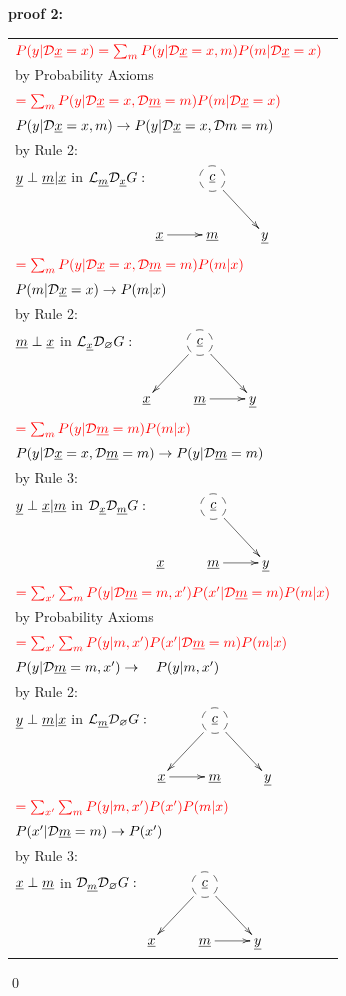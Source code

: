 {\bf * proof 2:}
\begin{longtable}{l}
$\color{red}
P(y|\cald\rvx=x)=
\sum_m
P(y|\cald\rvx=x, m)
P(m|\cald\rvx=x)$
\\
\quad by Probability Axioms
\\
$\color{red}=
\sum_m
P(y|\cald\rvx=x, \cald\rvm=m)
P(m|\cald\rvx=x)$
\\
\quad $P(y|\cald\rvx=x, m)\rarrow
P(y|\cald\rvx=x, \cald m=m)$
\\
\quad by Rule 2:
\\
\quad $\rvy\perp \rvm|\rvx$ in
$\call_\rvm\cald_\rvx G:$
$\xymatrix{
&*++[F-o]{\rvc}\ar[rd]
\\
\rvx\ar[r]
&\rvm
&\rvy
}$
\\
$\color{red}=
\sum_m
P(y|\cald\rvx=x, \cald\rvm=m)
P(m| x)$
\\
\quad $P(m|\cald\rvx=x)\rarrow P(m|x)$
\\
\quad by Rule 2:
\\
\quad
$\rvm\perp \rvx$ in
$\call_\rvx\cald_\eset G:$
$\xymatrix{
&*++[F-o]{\rvc}\ar[ld]\ar[rd]
\\
\rvx
&\rvm\ar[r]
&\rvy
}$
\\
$\color{red}=
\sum_m
P(y|\cald\rvm=m)
P(m|x)$
\\
\quad $P(y|\cald\rvx=x, \cald\rvm=m)
\rarrow
 P(y|\cald\rvm=m)$
\\
\quad by Rule 3:
\\
\quad
$\rvy\perp\rvx|\rvm$ in
$\cald_\rvx\cald_\rvm G:$
$\xymatrix{
&*++[F-o]{\rvc}\ar[rd]
\\
\rvx
&\rvm\ar[r]
&\rvy
}$
\\
$\color{red}=
\sum_{x'}
\sum_m
P(y|\cald\rvm=m, x')
P(x'|\cald\rvm=m)
P(m|x)$
\\
\quad by Probability Axioms
\\
$\color{red}=
\sum_{x'}
\sum_m
P(y|m, x')
P(x'|\cald\rvm=m)
P(m|x)$
\\
\quad $P(y|\cald\rvm=m, x')
\rarrow
\quad P(y|m, x')$
\\
\quad by Rule 2:
\\
\quad
$\rvy\perp\rvm|\rvx$ in
$\call_\rvm \cald_\eset G:$
$\xymatrix{
&*++[F-o]{\rvc}\ar[rd]\ar[ld]
\\
\rvx\ar[r]
&\rvm
&\rvy
}$
\\
$\color{red}=
\sum_{x'}
\sum_m
P(y|m, x')
P(x')
P(m|x)$
\\
\quad $P(x'|\cald\rvm=m)
\rarrow
P(x')$
\\
\quad by Rule 3:
\\
\quad
$\rvx\perp\rvm$ in
$\cald_\rvm \cald_\eset G:$
$\xymatrix{
&*++[F-o]{\rvc}\ar[rd]\ar[ld]
\\
\rvx
&\rvm\ar[r]
&\rvy
}$
\end{longtable}
\qed



